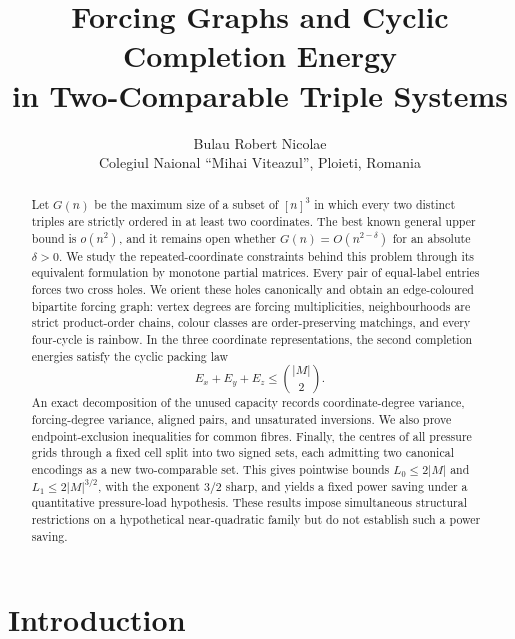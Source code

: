 \documentclass[11pt]{article}
\title{Forcing Graphs and Cyclic Completion Energy\\
in Two-Comparable Triple Systems}
\author{Bulau Robert Nicolae\\
\small Colegiul Na\textcommabelow{t}ional ``Mihai Viteazul'',
Ploie\textcommabelow{s}ti, Romania}
\date{}
\numberwithin{equation}{section}
\theoremstyle{definition}
\theoremstyle{remark}
\begin{document}
\maketitle

\begin{abstract}
Let $G(n)$ be the maximum size of a subset of $[n]^3$ in which every two
distinct triples are strictly ordered in at least two coordinates.  The best
known general upper bound is $o(n^2)$, and it remains open whether
$G(n)=O(n^{2-\delta})$ for an absolute $\delta>0$.  We study the repeated-coordinate
constraints behind this problem through its equivalent formulation by monotone
partial matrices.  Every pair of equal-label entries forces two cross holes.
We orient these holes canonically and obtain an edge-coloured bipartite forcing
graph: vertex degrees are forcing multiplicities, neighbourhoods are strict
product-order chains, colour classes are order-preserving matchings, and every
four-cycle is rainbow.  In the three coordinate representations, the second
completion energies satisfy the cyclic packing law
\[
 E_x+E_y+E_z\le \binom{|M|}{2}.
\]
An exact decomposition of the unused capacity records coordinate-degree
variance, forcing-degree variance, aligned pairs, and unsaturated inversions.
We also prove endpoint-exclusion inequalities for common fibres.  Finally, the
centres of all pressure grids through a fixed cell split into two signed sets,
each admitting two canonical encodings as a new two-comparable set.  This gives
pointwise bounds $L_0\le 2|M|$ and $L_1\le 2|M|^{3/2}$, with the exponent $3/2$
sharp, and yields a fixed power saving under a quantitative pressure-load
hypothesis.  These results impose simultaneous structural restrictions on a
hypothetical near-quadratic family but do not establish such a power saving.
\end{abstract}

\section{Introduction}
\end{document}
